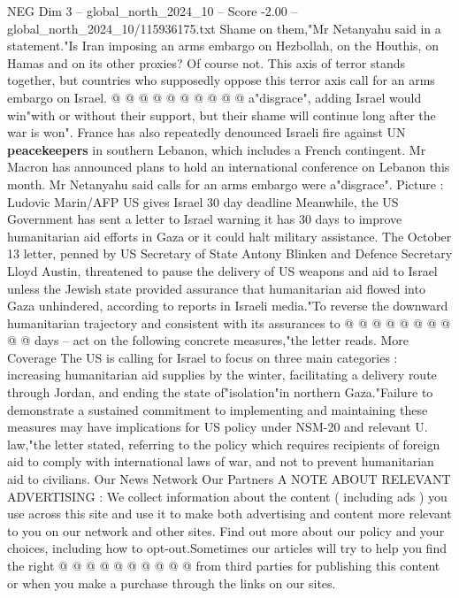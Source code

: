 \begin{textsample}{NEG Dim 3 – global\_north\_2024\_10 – Score -2.00 – global\_north\_2024\_10/115936175.txt}
Shame on them,"Mr Netanyahu said in a statement."Is Iran imposing an arms embargo on Hezbollah, on the Houthis, on Hamas and on its other proxies?
Of course not.
This axis of terror stands together, but countries who supposedly oppose this terror axis call for an arms embargo on Israel. @ @ @ @ @ @ @ @ @ @ a"disgrace", adding Israel would win"with or without their support, but their shame will continue long after the war is won".
France has also repeatedly denounced Israeli fire against UN \textbf{peacekeepers} in southern Lebanon, which includes a French contingent.
Mr Macron has announced plans to hold an international conference on Lebanon this month.
Mr Netanyahu said calls for an arms embargo were a"disgrace".
Picture : Ludovic Marin/AFP US gives Israel 30 day deadline Meanwhile, the US Government has sent a letter to Israel warning it has 30 days to improve humanitarian aid efforts in Gaza or it could halt military assistance.
The October 13 letter, penned by US Secretary of State Antony Blinken and Defence Secretary Lloyd Austin, threatened to pause the delivery of US weapons and aid to Israel unless the Jewish state provided assurance that humanitarian aid flowed into Gaza unhindered, according to reports in Israeli media."To reverse the downward humanitarian trajectory and consistent with its assurances to @ @ @ @ @ @ @ @ @ @ days -- act on the following concrete measures,"the letter reads.
More Coverage The US is calling for Israel to focus on three main categories : increasing humanitarian aid supplies by the winter, facilitating a delivery route through Jordan, and ending the state of"isolation"in northern Gaza."Failure to demonstrate a sustained commitment to implementing and maintaining these measures may have implications for US policy under NSM-20 and relevant U. law,"the letter stated, referring to the policy which requires recipients of foreign aid to comply with international laws of war, and not to prevent humanitarian aid to civilians.
Our News Network Our Partners A NOTE ABOUT RELEVANT ADVERTISING : We collect information about the content ( including ads ) you use across this site and use it to make both advertising and content more relevant to you on our network and other sites.
Find out more about our policy and your choices, including how to opt-out.Sometimes our articles will try to help you find the right @ @ @ @ @ @ @ @ @ @ from third parties for publishing this content or when you make a purchase through the links on our sites.

\end{textsample}
